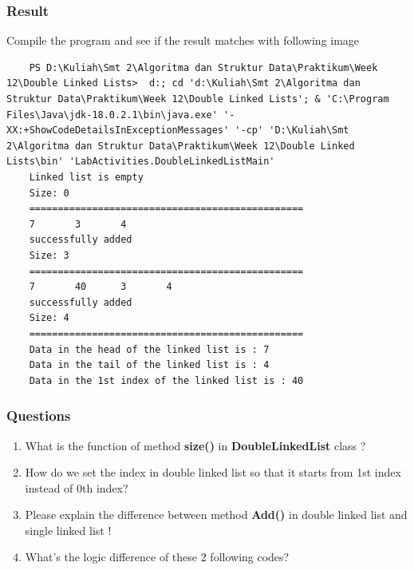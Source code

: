 \documentclass[12pt,titlepage]{article}
\begin{document}
\subsubsection{Result}
Compile the program and see if the result matches with following image
\begin{verbatim}
    PS D:\Kuliah\Smt 2\Algoritma dan Struktur Data\Praktikum\Week 12\Double Linked Lists>  d:; cd 'd:\Kuliah\Smt 2\Algoritma dan Struktur Data\Praktikum\Week 12\Double Linked Lists'; & 'C:\Program Files\Java\jdk-18.0.2.1\bin\java.exe' '-XX:+ShowCodeDetailsInExceptionMessages' '-cp' 'D:\Kuliah\Smt 2\Algoritma dan Struktur Data\Praktikum\Week 12\Double Linked Lists\bin' 'LabActivities.DoubleLinkedListMain' 
    Linked list is empty
    Size: 0
    ================================================
    7       3       4
    successfully added
    Size: 3
    ================================================
    7       40      3       4
    successfully added
    Size: 4
    ================================================
    Data in the head of the linked list is : 7
    Data in the tail of the linked list is : 4
    Data in the 1st index of the linked list is : 40
\end{verbatim}

\subsubsection{Questions}
\begin{enumerate}
    \item What is the function of method \textbf{size()} in \textbf{DoubleLinkedList} class ?
    \item How do we set the index in double linked list so that it starts from 1st index instead of 0th index?
    \item Please explain the difference between method \textbf{Add()} in double linked list and single linked list !
    \item What’s the logic difference of these 2 following codes?
\end{enumerate}
\end{document}
